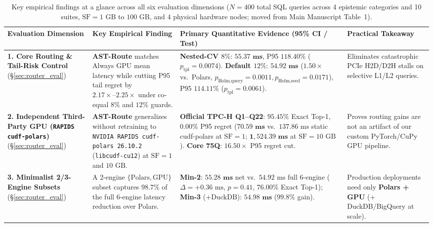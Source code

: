 \documentclass[10pt,a4paper]{article}
\begin{document}
\begin{table}[htbp]
\centering
\scriptsize
\setlength{\tabcolsep}{3.5pt}
\caption{Key empirical findings at a glance across all six evaluation dimensions ($N=400$ total SQL queries across 4 epistemic categories and 10 suites, $\text{SF}=1\text{ GB}$ to $100\text{ GB}$, and 4 physical hardware nodes; moved from Main Manuscript Table~1).}\label{tab:supp_key_findings_glance}
\begin{tabular}{@{}p{2.3cm}p{3.9cm}p{4.3cm}p{2.9cm}@{}}
\toprule
\textbf{Evaluation Dimension} & \textbf{Key Empirical Finding} & \textbf{Primary Quantitative Evidence (95\% CI / Test)} & \textbf{Practical Takeaway} \\
\midrule
\textbf{1. Core Routing \& Tail-Risk Control} (\S\ref{sec:router_eval}) & \textbf{AST-Route} matches Always GPU mean latency while cutting P95 tail regret by $\mathbf{2.17\times\text{--}2.25\times}$ under co-equal $8\%$ and $12\%$ guards. & \textbf{Nested-CV $8\%$}: $\mathbf{55.37\text{ ms}}$, P95 $\mathbf{118.40\%}$ ($p_{\text{tpl}}=0.0074$). \textbf{Default $12\%$}: $\mathbf{54.92\text{ ms}}$ ($1.50\times$ vs.\ Polars, $p_{\text{Holm,query}}=0.0011, p_{\text{Holm,seed}}=0.0171$), P95 $\mathbf{114.11\%}$ ($p_{\text{tpl}}=0.0061$). & Eliminates catastrophic PCIe H2D/D2H stalls on selective L1/L2 queries. \\
\textbf{2. Independent Third-Party GPU (\texttt{RAPIDS cudf-polars})} (\S\ref{sec:router_eval}) & \textbf{AST-Route} generalizes without retraining to \texttt{NVIDIA RAPIDS cudf-polars 26.10.2} (\texttt{libcudf-cu12}) at $\text{SF}=1$ and $10\text{ GB}$. & \textbf{Official TPC-H Q1--Q22}: $\mathbf{95.45\%}$ Exact Top-1, $\mathbf{0.00\%}$ P95 regret ($\mathbf{70.59\text{ ms}}$ vs.\ $137.86\text{ ms}$ static cudf-polars at $\text{SF}=1$; $\mathbf{1{,}524.39\text{ ms}}$ at $\text{SF}=10\text{ GB}$). \textbf{Core 75Q}: $\mathbf{16.50\times}$ P95 regret cut. & Proves routing gains are not an artifact of our custom PyTorch/CuPy GPU pipeline. \\
\textbf{3. Minimalist 2/3-Engine Subsets} (\S\ref{sec:router_eval}) & A 2-engine \textbf{$\{\text{Polars}, \text{GPU}\}$} subset captures $\mathbf{98.7\%}$ of the full 6-engine latency reduction over Polars. & \textbf{Min-2}: $\mathbf{55.28\text{ ms}}$ net vs.\ $54.92\text{ ms}$ full 6-engine ($\Delta = +0.36\text{ ms}$, $p=0.41$, $\mathbf{76.00\%}$ Exact Top-1); \textbf{Min-3} ($+\text{DuckDB}$): $\mathbf{54.98\text{ ms}}$ ($\mathbf{99.8\%}$ gain). & Production deployments need only \textbf{Polars + GPU} (+ DuckDB/BigQuery at scale). \\

\end{tabular}
\end{table}
\end{document}
